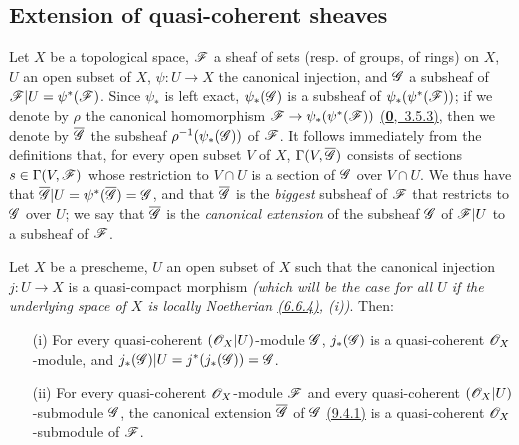 \subsection{Extension of quasi-coherent sheaves}
\label{subsection-extension-of-qcoh}

\begin{env}[9.4.1]
\label{env-1.9.4.1}
Let
$X$ be a topological space, $\mathscr{F}$ a sheaf of sets (resp. of groups, of rings) on $X$, $U$
an open subset of $X$, $\psi:U\to X$ the canonical injection, and $\mathscr{G}$ a subsheaf of
$\mathscr{F}|U=\psi^*(\mathscr{F})$. Since $\psi_*$ is left exact, $\psi_*(\mathscr{G})$ is a subsheaf of
$\psi_*(\psi^*(\mathscr{F}))$; if we denote by $\rho$ the canonical homomorphism
$\mathscr{F}\to\psi_*(\psi^*(\mathscr{F}))$ \hyperref[env-0.3.5.3]{(\textbf{0},~3.5.3)}, then we denote by $\overline{\mathscr{G}}$
the subsheaf $\rho^{-1}(\psi_*(\mathscr{G}))$ of $\mathscr{F}$. It follows immediately from the
definitions that, for every open subset $V$ of $X$, $\Gamma(V,\overline{\mathscr{G}})$ consists of
sections $s\in\Gamma(V,\mathscr{F})$ whose restriction to $V\cap U$ is a section of $\mathscr{G}$ over
$V\cap U$. We thus have that $\overline{\mathscr{G}}|U=\psi^*(\overline{\mathscr{G}})=\mathscr{G}$, and that
$\overline{\mathscr{G}}$ is the {\em biggest} subsheaf of $\mathscr{F}$ that restricts to $\mathscr{G}$
over $U$; we say that $\overline{\mathscr{G}}$ is the {\em canonical extension} of the subsheaf
$\mathscr{G}$ of $\mathscr{F}|U$ to a subsheaf of $\mathscr{F}$.
\end{env}

\begin{prop}[9.4.2]
\label{prop-1.9.4.2}
Let $X$ be a prescheme, $U$ an open subset of $X$ such that the canonical injection
$j:U\to X$ is a quasi-compact morphism {\em (which will be the case for {\em all} $U$ if
the underlying space of $X$ is {\em locally Noetherian}
\hyperref[env-1.6.6.4]{(6.6.4)}, (i))}. Then:
\begin{itemize}
  \item[{\rm(i)}] For every quasi-coherent $(\mathscr{O}_X|U)$-module $\mathscr{G}$, $j_*(\mathscr{G})$
    is a quasi-coherent $\mathscr{O}_X$-module, and $j_*(\mathscr{G})|U=j^*(j_*(\mathscr{G}))=\mathscr{G}$.
  \item[{\rm(ii)}] For every quasi-coherent $\mathscr{O}_X$-module $\mathscr{F}$ and every quasi-coherent
    $(\mathscr{O}_X|U)$-submodule $\mathscr{G}$, the canonical extension
    $\overline{\mathscr{G}}$ of $\mathscr{G}$ \hyperref[env-1.9.4.1]{(9.4.1)} is a
    quasi-coherent $\mathscr{O}_X$-submodule of $\mathscr{F}$.
\end{itemize}
\end{prop}

